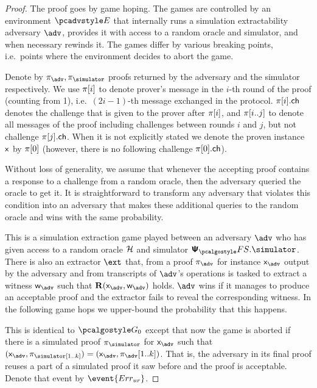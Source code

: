 \documentclass[runningheads,11pt]{llncs}
\theoremstyle{definition} \newtheorem{definition}[theorem]{Definition}
\begin{document}
\begin{proof}		
  The proof goes by game hoping. The games are controlled by an environment
  $\env$ that internally runs a simulation extractability adversary $\advse$,
  provides it with access to a random oracle and simulator, and when necessary
  rewinds it. The games differ by various breaking points, i.e.~points where the
  environment decides to abort the game.

  Denote by $\zkproof_{\advse}, \zkproof_{\simulator}$ proofs returned by the
  adversary and the simulator respectively. We use $\pi[i]$ to denote
  prover's message in the $i$-th round of the proof (counting from 1), i.e.~$(2i
  - 1)$-th message exchanged in the protocol. $\pi[i].\mathsf{ch}$ denotes the
  challenge that is given to the prover after $\pi[i]$, and
  $\pi[i..j]$ to denote all messages of the proof including challenges
  between rounds $i$ and $j$, but not challenge $\pi[j].\mathsf{ch}$. When it is
  not explicitly stated we denote the proven instance $\mathsf{x}$ by $\pi[0]$
  (however, there is no following challenge $\pi[0].\mathsf{ch}$).

  Without loss of generality, we assume that whenever the accepting proof
  contains a response to a challenge from a random oracle, then the
  adversary queried the oracle to get it. It is straightforward to transform any
  adversary that violates this condition into an adversary that makes these
  additional queries to the random oracle and wins with the same probability.

   This is a simulation extraction game played between an adversary
  $\advse$ who has given access to a random oracle $\mathcal{H}$ and simulator
  $\psfs.\simulator$. There is also an extractor $\ext$ that, from a proof
  $\zkproof_{\advse}$ for instance $\inp_{\advse}$ output by the adversary and from
   transcripts of $\advse$'s operations is tasked to extract a witness
  $\wit_{\advse}$ such that $\REL(\inp_{\advse}, \wit_{\advse})$ holds. $\advse$ wins
  if it manages to produce an acceptable proof and the extractor fails to reveal
  the corresponding witness. In the following game hops we upper-bound the
  probability that this happens.

   This is identical to $\game{0}$ except that now the game is aborted
  if there is a simulated proof $\zkproof_\simulator$ for $\inp_{\advse}$ such
  that $(\inp_{\advse}, \zkproof_\simulator[1..k]) = (\inp_{\advse},
  \zkproof_{\advse}[1..k])$. That is, the adversary in its final proof
  reuses a part of a simulated proof it saw before and the proof is acceptable.
  Denote that event by $\event{\errur}$.


\end{proof}
\end{document}
